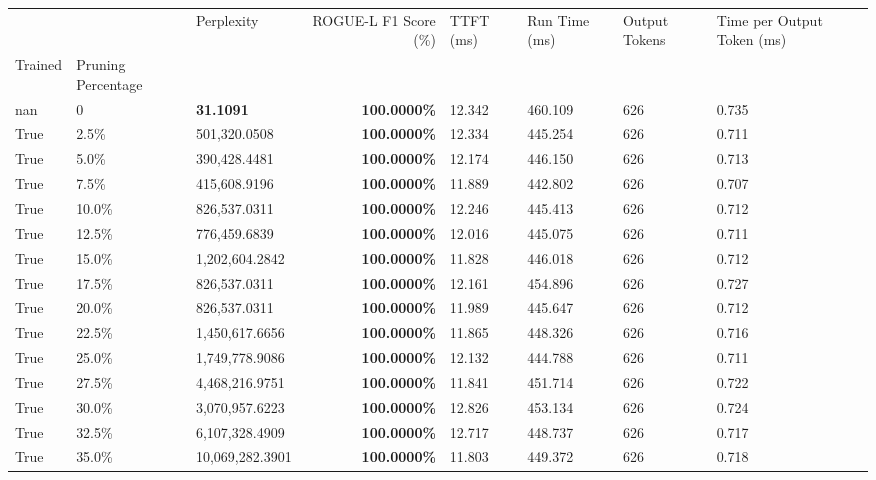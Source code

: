 \begin{table}[H]
\label{tab:evaluation-pipeline-5-trained}
\begin{tabular}{lllrllll}
\toprule
 &  & Perplexity & ROGUE-L F1 Score (\%) & TTFT (ms) & Run Time (ms) & Output Tokens & Time per Output Token (ms) \\
Trained & Pruning Percentage &  &  &  &  &  &  \\
\midrule
nan & 0 & \bfseries 31.1091 & \bfseries 100.0000\% & 12.342 & 460.109 & 626 & 0.735 \\
\cline{1-8}
True & 2.5\% & 501,320.0508 & \bfseries \color{red} 100.0000\% & 12.334 & 445.254 & 626 & 0.711 \\
\cline{1-8}
True & 5.0\% & 390,428.4481 & \bfseries \color{red} 100.0000\% & 12.174 & 446.150 & 626 & 0.713 \\
\cline{1-8}
True & 7.5\% & 415,608.9196 & \bfseries \color{red} 100.0000\% & 11.889 & 442.802 & 626 & 0.707 \\
\cline{1-8}
True & 10.0\% & 826,537.0311 & \bfseries \color{red} 100.0000\% & 12.246 & 445.413 & 626 & 0.712 \\
\cline{1-8}
True & 12.5\% & 776,459.6839 & \bfseries \color{red} 100.0000\% & 12.016 & 445.075 & 626 & 0.711 \\
\cline{1-8}
True & 15.0\% & 1,202,604.2842 & \bfseries \color{red} 100.0000\% & 11.828 & 446.018 & 626 & 0.712 \\
\cline{1-8}
True & 17.5\% & 826,537.0311 & \bfseries \color{red} 100.0000\% & 12.161 & 454.896 & 626 & 0.727 \\
\cline{1-8}
True & 20.0\% & 826,537.0311 & \bfseries \color{red} 100.0000\% & 11.989 & 445.647 & 626 & 0.712 \\
\cline{1-8}
True & 22.5\% & 1,450,617.6656 & \bfseries \color{red} 100.0000\% & 11.865 & 448.326 & 626 & 0.716 \\
\cline{1-8}
True & 25.0\% & 1,749,778.9086 & \bfseries \color{red} 100.0000\% & 12.132 & 444.788 & 626 & 0.711 \\
\cline{1-8}
True & 27.5\% & 4,468,216.9751 & \bfseries \color{red} 100.0000\% & 11.841 & 451.714 & 626 & 0.722 \\
\cline{1-8}
True & 30.0\% & 3,070,957.6223 & \bfseries \color{red} 100.0000\% & 12.826 & 453.134 & 626 & 0.724 \\
\cline{1-8}
True & 32.5\% & 6,107,328.4909 & \bfseries \color{red} 100.0000\% & 12.717 & 448.737 & 626 & 0.717 \\
\cline{1-8}
True & 35.0\% & 10,069,282.3901 & \bfseries \color{red} 100.0000\% & 11.803 & 449.372 & 626 & 0.718 \\

\end{tabular}
\end{table}
